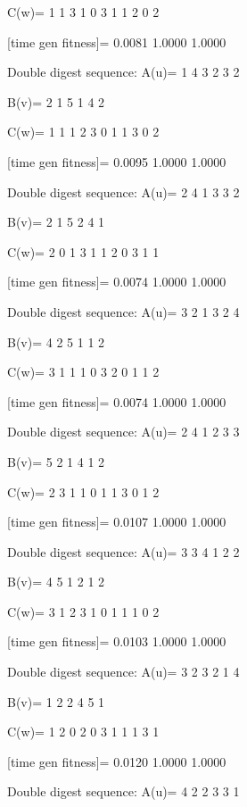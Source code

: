 C(w)=
     1     1     3     1     0     3     1     1     2     0     2

[time gen fitness]=
    0.0081    1.0000    1.0000

Double digest sequence:
A(u)=
     1     4     3     2     3     2

B(v)=
     2     1     5     1     4     2

C(w)=
     1     1     1     2     3     0     1     1     3     0     2

[time gen fitness]=
    0.0095    1.0000    1.0000

Double digest sequence:
A(u)=
     2     4     1     3     3     2

B(v)=
     2     1     5     2     4     1

C(w)=
     2     0     1     3     1     1     2     0     3     1     1

[time gen fitness]=
    0.0074    1.0000    1.0000

Double digest sequence:
A(u)=
     3     2     1     3     2     4

B(v)=
     4     2     5     1     1     2

C(w)=
     3     1     1     1     0     3     2     0     1     1     2

[time gen fitness]=
    0.0074    1.0000    1.0000

Double digest sequence:
A(u)=
     2     4     1     2     3     3

B(v)=
     5     2     1     4     1     2

C(w)=
     2     3     1     1     0     1     1     3     0     1     2

[time gen fitness]=
    0.0107    1.0000    1.0000

Double digest sequence:
A(u)=
     3     3     4     1     2     2

B(v)=
     4     5     1     2     1     2

C(w)=
     3     1     2     3     1     0     1     1     1     0     2

[time gen fitness]=
    0.0103    1.0000    1.0000

Double digest sequence:
A(u)=
     3     2     3     2     1     4

B(v)=
     1     2     2     4     5     1

C(w)=
     1     2     0     2     0     3     1     1     1     3     1

[time gen fitness]=
    0.0120    1.0000    1.0000

Double digest sequence:
A(u)=
     4     2     2     3     3     1

